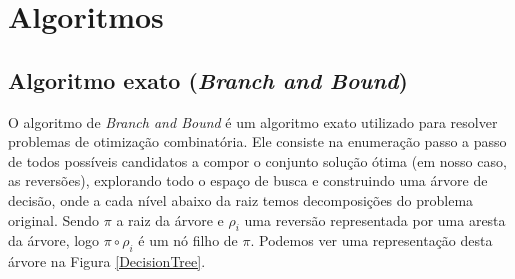 \chapter{Algoritmos}
\label{Algoritmos}
\section{Algoritmo exato (\textit{Branch and Bound})}


O algoritmo de \textit{Branch and Bound} é um algoritmo exato utilizado para resolver problemas de otimização combinatória. Ele consiste na enumeração passo a passo de todos possíveis candidatos a compor o conjunto solução ótima (em nosso caso, as reversões), explorando todo o espaço de busca e construindo uma árvore de decisão, onde a cada nível abaixo da raiz temos decomposições do problema original. Sendo $\pi$ a raiz da árvore e $\rho_i$ uma reversão representada por uma aresta da árvore, logo $\pi \circ \rho_i$ é um nó filho de $\pi$. Podemos ver uma representação desta árvore na Figura \ref{DecisionTree}. 


